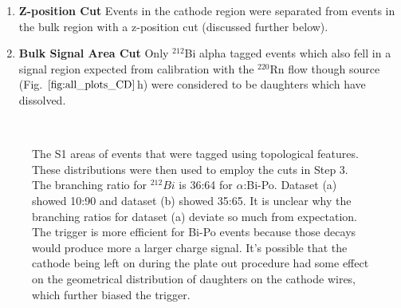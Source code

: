 \begin{enumerate}
\item \textbf{Z-position Cut} Events in the cathode region were separated from events in the bulk region with a z-position cut (discussed further below).
\item \textbf{Bulk Signal Area Cut} Only $^{212}$Bi alpha tagged events which also fell in a signal region expected from calibration with the $^{220}$Rn flow though source (Fig. $\ref{fig:all_plots_CD}$h) were considered to be daughters which have dissolved.
\end{enumerate}



\begin{figure}[hbtp]
\centering
{}\\
\caption[]{The S1 areas of events that were tagged using topological features. These distributions were then used to employ the cuts in Step 3. The branching ratio for $^{212}Bi$ is 36:64 for $\alpha$:Bi-Po. Dataset (a) showed 10:90 and dataset (b) showed 35:65. It is unclear why the branching ratios for dataset (a) deviate so much from expectation. The trigger is more efficient for Bi-Po events because those decays would produce more a larger charge signal. It's possible that the cathode being left on during the plate out procedure had some effect on the geometrical distribution of daughters on the cathode wires, which further biased the trigger.}
\label{fig:area_cut}
\end{figure}


